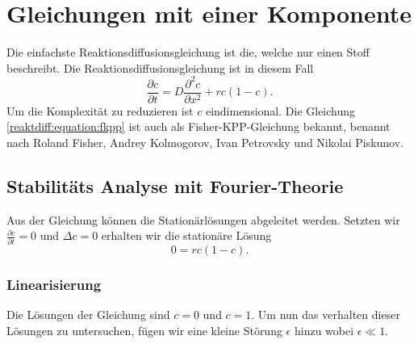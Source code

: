 %
%
%
%
\section{Gleichungen mit einer Komponente
\label{reaktdiff:section:einKomponent}}
Die einfachste Reaktionsdiffusionsgleichung ist die, welche nur einen Stoff beschreibt.
Die Reaktionsdiffusionsgleichung ist in diesem Fall
\begin{equation*}
\label{reaktdiff:equation:fkpp}
\frac{\partial c}{\partial t} = D \frac{\partial^2 c}{\partial x^2} + rc(1-c).
\end{equation*}
Um die Komplexität zu reduzieren ist \(c\) eindimensional. 
Die Gleichung \eqref{reaktdiff:equation:fkpp} ist auch als Fisher-KPP-Gleichung \cite{reaktdiff:wikipedia_kpp_fisher} bekannt, benannt nach Roland Fisher, Andrey Kolmogorov, Ivan Petrovsky und Nikolai Piskunov.

\subsection{Stabilitäts Analyse mit Fourier-Theorie
\label{reaktdiff:subsection:fkppmathe}}
Aus der Gleichung können die Stationärlösungen abgeleitet werden.
Setzten wir \(\frac{\partial c}{\partial t} = 0\) und \(\Delta c = 0\) erhalten wir die stationäre Lösung
\begin{equation*}
\label{reaktdiff:equation:stationaer}
0 = rc(1-c).
\end{equation*}

\subsubsection{Linearisierung}
Die Lösungen der Gleichung sind \(c = 0\) und \(c = 1\).
Um nun das verhalten dieser Lösungen zu untersuchen, fügen wir eine kleine Störung \(\epsilon\) hinzu wobei \(\epsilon \ll 1\).

